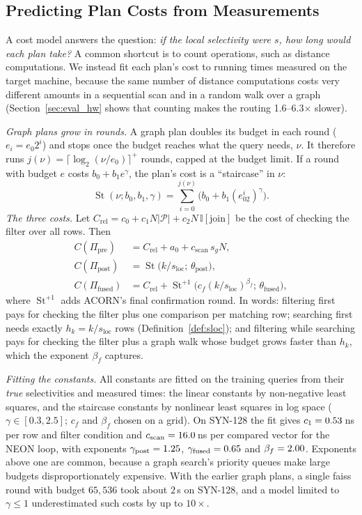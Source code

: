 \documentclass[sigconf,nonacm]{acmart}
\newcommand{\sg}{s_g}
\newcommand{\sloc}{s_{\text{loc}}}
\newcommand{\Ppre}{\Pi_{\text{pre}}}
\newcommand{\Pfus}{\Pi_{\text{fused}}}
\newcommand{\Ppost}{\Pi_{\text{post}}}
\begin{document}
\subsection{Predicting Plan Costs from Measurements}\label{sec:costs}\label{sec:routing}
A cost model answers the question: \emph{if the local selectivity were $s$, how long would each plan take?} A common shortcut is to count operations, such as distance computations. We instead fit each plan's cost to running times measured on the target machine, because the same number of distance computations costs very different amounts in a sequential scan and in a random walk over a graph (Section~\ref{sec:eval_hw} shows that counting makes the routing 1.6--6.3$\times$ slower).

\emph{Graph plans grow in rounds.} A graph plan doubles its budget in each round ($e_i=e_0 2^i$) and stops once the budget reaches what the query needs, $\nu$. It therefore runs $j(\nu)=\lceil\log_2(\nu/e_0)\rceil^+$ rounds, capped at the budget limit. If a round with budget $e$ costs $b_0+b_1e^\gamma$, the plan's cost is a ``staircase'' in $\nu$:
\begin{equation}\label{eq:stair}
\operatorname{St}(\nu;b_0,b_1,\gamma)=\sum_{i=0}^{j(\nu)}\big(b_0+b_1(e_02^i)^\gamma\big).
\end{equation}
\emph{The three costs.} Let $C_{\text{rel}}=c_0+c_1N|\mathcal{P}|+c_2N\,\mathbb{I}[\text{join}]$ be the cost of checking the filter over all rows. Then
\begin{align}
C(\Ppre)&=C_{\text{rel}}+a_0+c_{\text{scan}}\,\sg N,\label{eq:cost_pre}\\
C(\Ppost)&=\operatorname{St}\!\big(k/\sloc;\,\theta_{\text{post}}\big),\label{eq:cost_post}\\
C(\Pfus)&=C_{\text{rel}}+\operatorname{St}^{+1}\!\big(c_f(k/\sloc)^{\beta_f};\,\theta_{\text{fused}}\big),\label{eq:cost_fused}
\end{align}
where $\operatorname{St}^{+1}$ adds ACORN's final confirmation round. In words: filtering first pays for checking the filter plus one comparison per matching row; searching first needs exactly $h_k=k/\sloc$ rows (Definition~\ref{def:sloc}); and filtering while searching pays for checking the filter plus a graph walk whose budget grows faster than $h_k$, which the exponent $\beta_f$ captures.

\emph{Fitting the constants.} All constants are fitted on the training queries from their \emph{true} selectivities and measured times: the linear constants by non-negative least squares, and the staircase constants by nonlinear least squares in log space ($\gamma\in[0.3,2.5]$; $c_f$ and $\beta_f$ chosen on a grid). On SYN-128 the fit gives $c_1=0.53$\,ns per row and filter condition and $c_{\text{scan}}=16.0$\,ns per compared vector for the NEON loop, with exponents $\gamma_{\text{post}}=1.25$, $\gamma_{\text{fused}}=0.65$ and $\beta_f=2.00$. Exponents above one are common, because a graph search's priority queues make large budgets disproportionately expensive. With the earlier graph plans, a single faiss round with budget $65{,}536$ took about $2$\,s on SYN-128, and a model limited to $\gamma\le1$ underestimated such costs by up to $10\times$.
\end{document}
